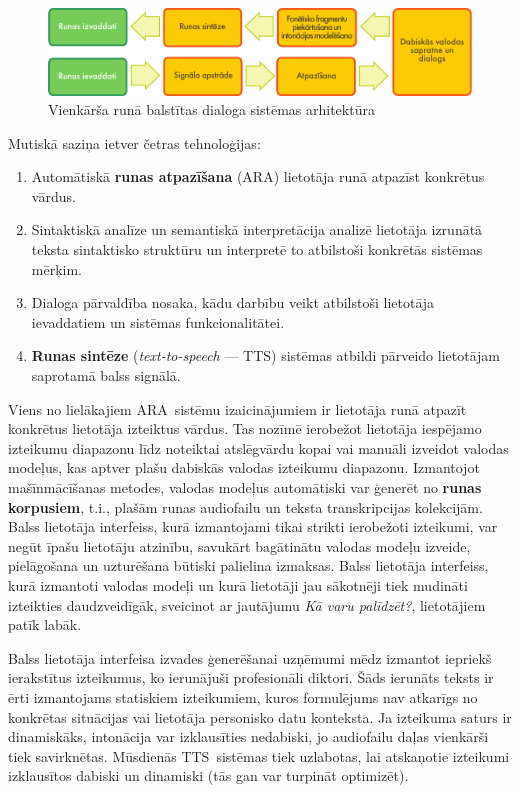 \begin{multicols}{2}
\begin{figure}[htb]
  \center 
  \includegraphics[width=\textwidth]{../_media/latvian/simple_speech-based_dialogue_architecture}
  \caption{Vienkārša runā balstītas dialoga sistēmas arhitektūra}
  \label{fig:dialoguearch_de}
\end{figure}
Mutiskā saziņa ietver četras tehnoloģijas: 

\begin{enumerate}
\item  Automātiskā \textbf{runas atpazīšana} (ARA) lietotāja runā atpazīst konkrētus vārdus.
\item  Sintaktiskā analīze un semantiskā interpretācija analizē lietotāja izrunātā teksta sintaktisko struktūru un interpretē to atbilstoši konkrētās sistēmas mērķim.
\item  Dialoga pārvaldība nosaka, kādu darbību veikt atbilstoši lietotāja ievaddatiem un sistēmas funkcionalitātei.
\item  \textbf{Runas sintēze} (\textit{text-to-speech} — TTS) sistēmas atbildi pārveido lietotājam saprotamā balss signālā. 
\end{enumerate}

Viens no lielākajiem ARA~sistēmu izaicinājumiem ir lietotāja runā atpazīt konkrētus lietotāja izteiktus vārdus.
Tas nozīmē ierobežot lietotāja iespējamo izteikumu diapazonu līdz noteiktai atslēgvārdu kopai vai manuāli izveidot valodas modeļus, kas aptver plašu dabiskās valodas izteikumu diapazonu.
Izmantojot mašīnmācīšanas metodes, valodas modeļus automātiski var ģenerēt no \textbf{runas korpusiem}, t.i., plašām runas audiofailu un teksta transkripcijas kolekcijām. 
Balss lietotāja interfeiss, kurā izmantojami tikai strikti ierobežoti izteikumi, var negūt īpašu lietotāju atzinību, savukārt bagātinātu valodas modeļu izveide, pielāgošana un uzturēšana būtiski palielina izmaksas.
Balss lietotāja interfeiss, kurā izmantoti valodas modeļi un kurā lietotāji jau sākotnēji tiek mudināti izteikties daudzveidīgāk, sveicinot ar jautājumu \textit{Kā varu palīdzēt?}, lietotājiem patīk labāk. 

Balss lietotāja interfeisa izvades ģenerēšanai uzņēmumi mēdz izmantot iepriekš ierakstītus izteikumus, ko ierunājuši profesionāli diktori.
Šāds ierunāts teksts ir ērti izmantojams statiskiem izteikumiem, kuros formulējums nav atkarīgs no konkrētas situācijas vai lietotāja personisko datu konteksta.
Ja izteikuma saturs ir dinamiskāks, intonācija var izklausīties nedabiski, jo audiofailu daļas vienkārši tiek savirknētas.
Mūsdienās TTS~sistēmas tiek uzlabotas, lai atskaņotie izteikumi izklausītos dabiski un dinamiski (tās gan var turpināt optimizēt).


\end{multicols}
